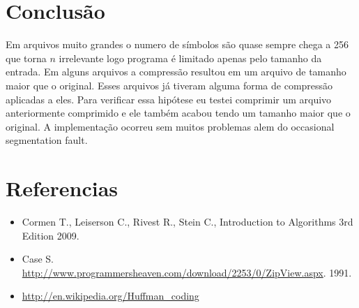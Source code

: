 \documentclass[a4paper, 11pt]{article}
\begin{document}
\section{Conclusão}
Em arquivos muito grandes o numero de símbolos são quase sempre chega a 256 que torna $n$ irrelevante logo programa é limitado apenas pelo tamanho da entrada. Em alguns arquivos a compressão resultou em um arquivo de tamanho maior que o original. Esses arquivos já tiveram alguma forma de compressão aplicadas a eles. Para verificar essa hipótese eu testei comprimir um arquivo anteriormente comprimido e ele também acabou tendo um tamanho maior que o original. A implementação ocorreu sem muitos problemas alem do occasional segmentation fault.

\section{Referencias}
\begin{itemize} 
\item Cormen T., Leiserson C., Rivest R., Stein C., Introduction to Algorithms 3rd Edition 2009.
\item Case S. \url{http://www.programmersheaven.com/download/2253/0/ZipView.aspx}. 1991.
\item \url{http://en.wikipedia.org/Huffman_coding}
\end{itemize}
\end{document}
